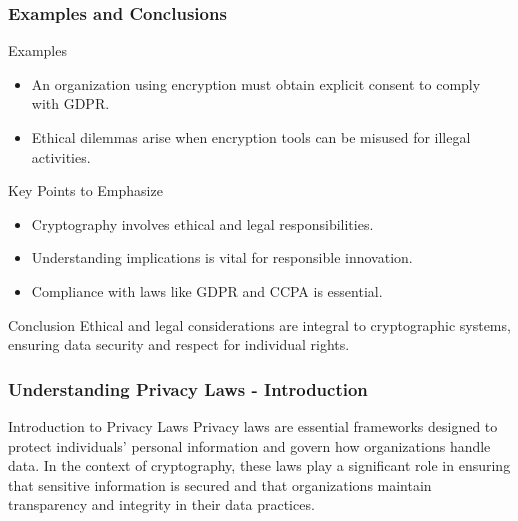 \documentclass{beamer}
\begin{document}
\begin{frame}[fragile]
    \frametitle{Examples and Conclusions}
    \begin{block}{Examples}
        \begin{itemize}
            \item An organization using encryption must obtain explicit consent to comply with GDPR.
            \item Ethical dilemmas arise when encryption tools can be misused for illegal activities.
        \end{itemize}
    \end{block}
    
    \begin{block}{Key Points to Emphasize}
        \begin{itemize}
            \item Cryptography involves ethical and legal responsibilities.
            \item Understanding implications is vital for responsible innovation.
            \item Compliance with laws like GDPR and CCPA is essential.
        \end{itemize}
    \end{block}
    
    \begin{block}{Conclusion}
        Ethical and legal considerations are integral to cryptographic systems, ensuring data security and respect for individual rights.
    \end{block}
\end{frame}

\begin{frame}[fragile]
    \frametitle{Understanding Privacy Laws - Introduction}
    \begin{block}{Introduction to Privacy Laws}
        Privacy laws are essential frameworks designed to protect individuals' personal information and govern how organizations handle data. 
        In the context of cryptography, these laws play a significant role in ensuring that sensitive information is secured and that organizations maintain transparency and integrity in their data practices.
    \end{block}
\end{frame}
\end{document}
